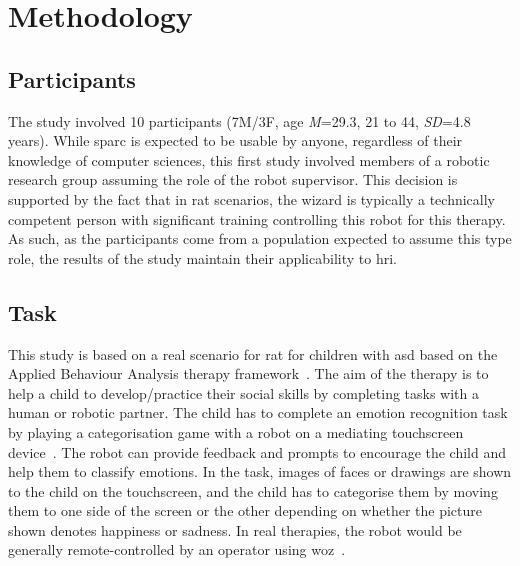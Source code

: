 \section{Methodology}

\subsection{Participants}

The study involved 10 participants (7M/3F, age \textit{M}=29.3, 21 to 44, \textit{SD}=4.8 years). While \gls{sparc} is expected to be usable by anyone, regardless of their knowledge of computer sciences, this first study involved members of a robotic research group assuming the role of the robot supervisor. This decision is supported by the fact that in \gls{rat} scenarios, the wizard is typically a technically competent person with significant training controlling this robot for this therapy. As such, as the participants come from a population expected to assume this type role, the results of the study maintain their applicability to \gls{hri}.

\subsection{Task}

This study is based on a real scenario for \gls{rat} for children with \gls{asd} based on the Applied Behaviour Analysis therapy framework~\citep{cooper2007applied}. The aim of the therapy is to help a child to develop/practice their social skills by completing tasks with a human or robotic partner. The child has to complete an emotion recognition task by playing a categorisation game with a robot on a mediating touchscreen device~\citep{baxter2012touchscreen}. The robot can provide feedback and prompts to encourage the child and help them to classify emotions. In the task, images of faces or drawings are shown to the child on the touchscreen, and the child has to categorise them by moving them to one side of the screen or the other depending on whether the picture shown denotes happiness or sadness. In real therapies, the robot would be generally remote-controlled by an operator using \gls{woz}~\citep{riek2012wizard}.

